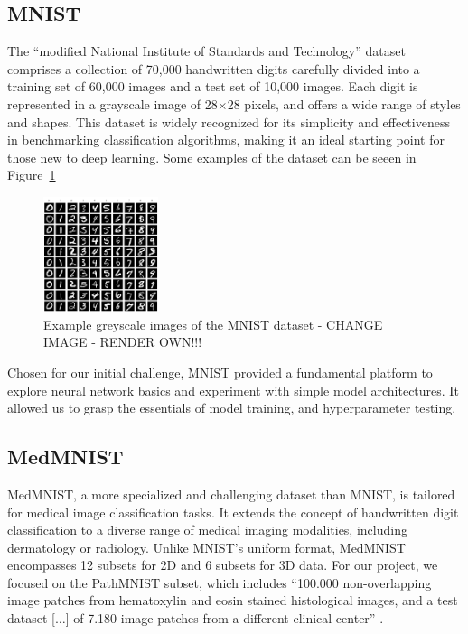 \subsection{MNIST}\label{mnist}
The ``modified National Institute of Standards and Technology'' dataset comprises a collection of 70,000 handwritten digits carefully divided into a training set of 60,000 images and a test set of 10,000 images. Each digit is represented in a grayscale image of 28$\times$28 pixels, and offers a wide range of styles and shapes. This dataset is widely recognized for its simplicity and effectiveness in benchmarking classification algorithms, making it an ideal starting point for those new to deep learning. Some examples of the dataset can be seeen in Figure~\ref{fig:MNIST}

\begin{figure}
    \centering
    \includegraphics[width=0.3\textwidth]{figures/MNIST.png}
    \caption{Example greyscale images of the MNIST dataset - CHANGE IMAGE - RENDER OWN!!!}\label{fig:MNIST}
\end{figure}

Chosen for our initial challenge, MNIST provided a fundamental platform to explore neural network basics and experiment with simple model architectures. It allowed us to grasp the essentials of model training, and hyperparameter testing.


\subsection{MedMNIST}\label{medmnist}

MedMNIST, a more specialized and challenging dataset than MNIST, is tailored for medical image classification tasks. It extends the concept of handwritten digit classification to a diverse range of medical imaging modalities, including dermatology or radiology. Unlike MNIST's uniform format, MedMNIST encompasses 12 subsets for 2D and 6 subsets for 3D data. For our project, we focused on the PathMNIST subset, which includes ``100.000 non-overlapping image patches from hematoxylin and eosin stained histological images, and a test dataset [$\ldots$] of 7.180 image patches from a different clinical center'' \citep{medmnistv1}. 

